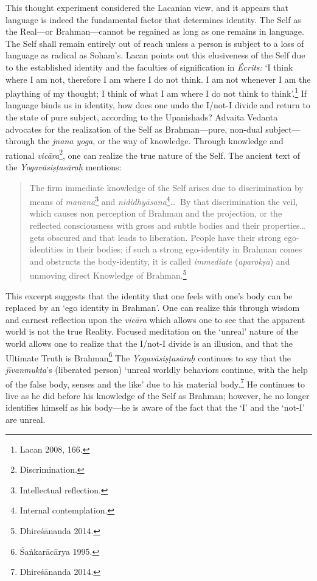 This thought experiment considered the Lacanian view, and it appears
that language is indeed the fundamental factor that determines identity.
The Self as the Real---or Brahman---cannot be regained as long as one
remains in language. The Self shall remain entirely out of reach unless
a person is subject to a loss of language as radical as Soham's. Lacan
points out this elusiveness of the Self due to the established identity
and the faculties of signification in \emph{\'Ecrits:} `I think where I am
not, therefore I am where I do not think. I am not whenever I am the
plaything of my thought; I think of what I am where I do not think to
think'.\footnote{Lacan 2008, 166.} If language binds us in identity, how does one
undo the I/not-I divide and return to the state of pure subject,
according to the Upanishads? Advaita Vedanta advocates for the
realization of the Self as Brahman---pure, non-dual subject---through
the \emph{jnana yoga}, or the way of knowledge. Through knowledge and
rational \emph{vic\=ara}\footnote{Discrimination.}, one can realize the
true nature of the Self. The ancient text of the \emph{Yogav\=asi\d s\d tas\=ara\d h}
mentions:
\begin{quote}
The firm immediate knowledge of the Self arises due to discrimination
by means of \emph{manana}\footnote{Intellectual reflection.} and
\emph{nididhy\=asana}\footnote{Internal contemplation.}\ldots\ By that
discrimination the veil, which causes non perception of Brahman and the
projection, or the reflected consciousness with gross and subtle bodies
and their properties\ldots{} gets obscured and that leads to liberation.
People have their strong ego-identities in their bodies; if such a
strong ego-identity in Brahman comes and obstructs the body-identity, it
is called \emph{immediate} (\emph{aparok\d sa}) and unmoving direct
Knowledge of Brahman.\footnote{Dhire\'s\=ananda 2014.}
\end{quote}
This excerpt suggests that the identity that one feels with one's body
can be replaced by an `ego identity in Brahman'. One can realize this
through wisdom and earnest reflection upon the \emph{vic\=ara} which
allows one to see that the apparent world is not the true Reality.
Focused meditation on the `unreal' nature of the world allows one to
realize that the I/not-I divide is an illusion, and that the Ultimate
Truth is Brahman\footnote{\'Sa\.nkar\=ac\=arya 1995.} The \emph{Yogav\=asi\d s\d tas\=ara\d h}
continues to say that the \emph{jīvanmukta}'s (liberated person) `unreal
worldly behaviors continue, with the help of the false body, senses and
the like' due to his material body.\footnote{Dhire\'s\=ananda 2014.} He continues to
live as he did before his knowledge of the Self as Brahman; however, he
no longer identifies himself as his body---he is aware of the fact that
the `I' and the `not-I' are unreal.

